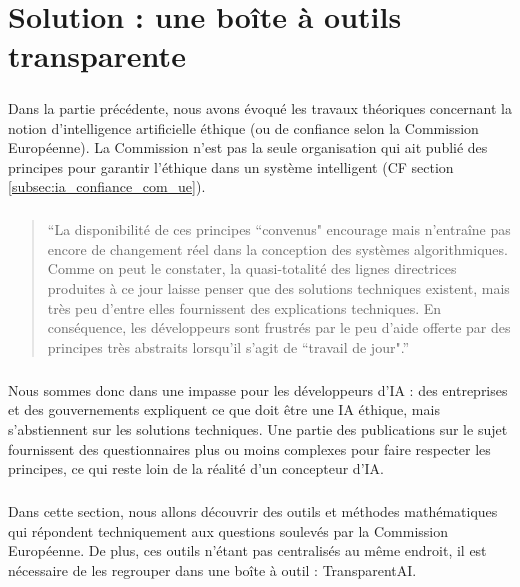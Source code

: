 \documentclass[10pt, french, a4paper]{report}
\begin{document}
\newpage
\chapter{Solution : une boîte à outils transparente}

\paragraph{}
Dans la partie précédente, nous avons évoqué les travaux théoriques concernant la notion d'intelligence artificielle éthique (ou de confiance selon la Commission Européenne). La Commission n'est pas la seule organisation qui ait publié des principes pour garantir l'éthique dans un système intelligent (CF section \ref{subsec:ia_confiance_com_ue}).

\paragraph{}
\begin{quotation}
  ``La disponibilité de ces principes ``convenus" encourage mais n'entraîne pas encore de changement réel dans la conception des systèmes algorithmiques. Comme on peut le constater, la quasi-totalité des lignes directrices produites à ce jour laisse penser que des solutions techniques existent, mais très peu d'entre elles fournissent des explications techniques. En conséquence, les développeurs sont frustrés par le peu d'aide offerte par des principes très abstraits lorsqu'il s'agit de ``travail de jour".''
\end{quotation}

\paragraph{}
Nous sommes donc dans une impasse pour les développeurs d'IA : des entreprises et des gouvernements expliquent ce que doit être une IA éthique, mais s'abstiennent sur les solutions techniques. Une partie des publications sur le sujet fournissent des questionnaires plus ou moins complexes pour faire respecter les principes, ce qui reste loin de la réalité d'un concepteur d'IA.

\paragraph{}
Dans cette section, nous allons découvrir des outils et méthodes mathématiques qui répondent techniquement aux questions soulevés par la Commission Européenne. De plus, ces outils n'étant pas centralisés au même endroit, il est nécessaire de les regrouper dans une boîte à outil : TransparentAI. 
\end{document}
